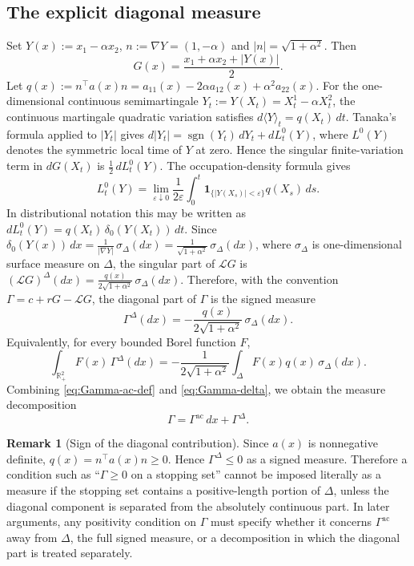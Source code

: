\documentclass[pdflatex,sn-mathphys-num]{sn-jnl}
\theoremstyle{plain}
\theoremstyle{definition}
\newtheorem{remark}[theorem]{Remark}
\newcommand{\R}{\mathbb{R}}
\DeclareMathOperator{\sgn}{sgn}
\begin{document}
\subsection{The explicit diagonal measure}
\label{sec:Gamma-delta}
Set
$\displaystyle    Y(x):=x_1-\alpha x_2$,
$\displaystyle    n:=\nabla Y=(1,-\alpha)$
and
$\displaystyle    |n|=\sqrt{1+\alpha^2}$.
Then
\[ 
G(x)=\frac{x_1+\alpha x_2+|Y(x)|}{2}.
\]
Let
$\displaystyle q(x):=n^\top a(x)n=a_{11}(x)-2\alpha a_{12}(x)+\alpha^2a_{22}(x)$.
For the one-dimensional continuous semimartingale
$Y_t:=Y(X_t)=X_t^1-\alpha X_t^2$, the continuous martingale quadratic variation
satisfies
$   d\langle Y\rangle_t=q(X_t)\,dt$.
Tanaka's formula \cite{revuz2013continuous,karatzas2014brownian} applied to $|Y_t|$
gives
$\displaystyle    d|Y_t|=\sgn(Y_t)\,dY_t+dL_t^0(Y)$,
where $L^0(Y)$ denotes the symmetric local time of $Y$ at zero. Hence the
singular finite-variation term in $dG(X_t)$ is
$\displaystyle    \tfrac12\,dL_t^0(Y)$.
The occupation-density formula gives
\[
   L_t^0(Y)
   =
   \lim_{\varepsilon\downarrow0}
   \frac{1}{2\varepsilon}
   \int_0^t
      \mathbf 1_{\{|Y(X_s)|<\varepsilon\}}
      q(X_s)\,ds.
\]
In distributional notation this may be written as
$\displaystyle    dL_t^0(Y)=q(X_t)\,\delta_0(Y(X_t))\,dt$.
Since
$\displaystyle    \delta_0(Y(x))\,dx
   =
   \frac{1}{|\nabla Y|}\,\sigma_\Delta(dx)
   =
   \frac{1}{\sqrt{1+\alpha^2}}\,\sigma_\Delta(dx)$,
where $\sigma_\Delta$ is one-dimensional surface measure on $\Delta$, the
singular part of $\mathcal LG$ is
$\displaystyle  (\mathcal LG)^\Delta(dx)
   =
   \frac{q(x)}{2\sqrt{1+\alpha^2}}\,\sigma_\Delta(dx)$.
Therefore, with the convention $\Gamma=c+rG-\mathcal LG$, the diagonal part of
$\Gamma$ is the signed measure
\begin{equation}
\label{eq:Gamma-delta}
   \Gamma^\Delta(dx)
   =
   -\frac{q(x)}{2\sqrt{1+\alpha^2}}\,\sigma_\Delta(dx).
\end{equation}
Equivalently, for every bounded Borel function $F$,
\[
   \int_{\R^2_+}F(x)\,\Gamma^\Delta(dx)
   =
   -\frac{1}{2\sqrt{1+\alpha^2}}
   \int_\Delta F(x)q(x)\,\sigma_\Delta(dx).
\]
Combining \eqref{eq:Gamma-ac-def} and \eqref{eq:Gamma-delta}, we obtain the
measure decomposition
\begin{equation}
\label{eq:Gamma-decomposition}
   \Gamma=\Gamma^{\mathrm{ac}}\,dx+\Gamma^\Delta.
\end{equation}

\begin{remark}[Sign of the diagonal contribution]
\label{rem:Gamma-delta-sign}
Since $a(x)$ is nonnegative definite, $q(x)=n^\top a(x)n\ge0$. Hence
$\Gamma^\Delta\le0$ as a signed measure. Therefore a condition such as
``$\Gamma\ge0$ on a stopping set'' cannot be imposed literally as a measure if
the stopping set contains a positive-length portion of $\Delta$, unless the
diagonal component is separated from the absolutely continuous part. In later
arguments, any positivity condition on $\Gamma$ must specify whether it
concerns $\Gamma^{\mathrm{ac}}$ away from $\Delta$, the full signed measure, or
a decomposition in which the diagonal part is treated separately.
\end{remark}
\end{document}
